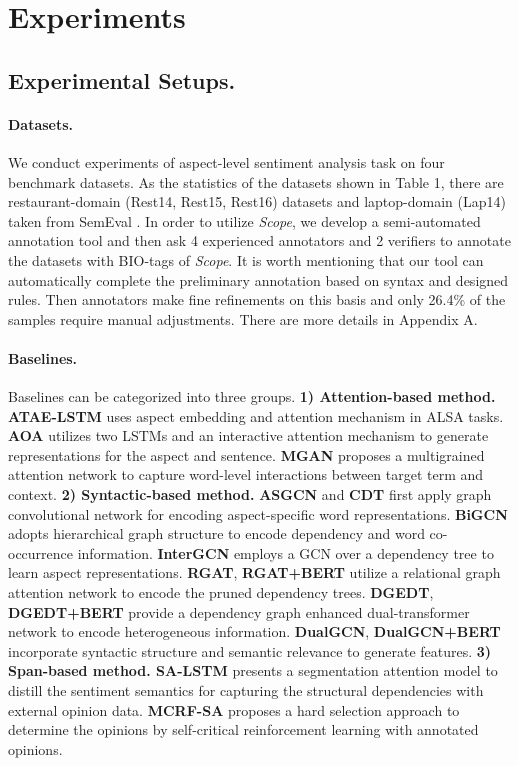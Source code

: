 \documentclass{article}
\begin{document}
\section{Experiments}
\subsection{Experimental Setups.}
\paragraph{Datasets.} We conduct experiments of aspect-level sentiment analysis task on four benchmark datasets. As the statistics of the datasets shown in Table 1, there are  restaurant-domain (Rest14, Rest15, Rest16) datasets and laptop-domain (Lap14) taken from SemEval \cite{maria2014semeval,pontiki2015semeval,pontiki2016semeval}. In order to utilize \emph{Scope}, we develop a semi-automated annotation tool and then ask 4 experienced annotators and 2 verifiers to annotate the datasets with BIO-tags of \emph{Scope}. It is worth mentioning that our tool can automatically complete the preliminary annotation based on syntax and designed rules. Then annotators make fine refinements on this basis and only 26.4\% of the samples require manual adjustments. There are more details in Appendix A.


\paragraph{Baselines.}
Baselines can be categorized into three groups.   \textbf{1) Attention-based method.} \textbf{ATAE-LSTM} \cite{wang2016attention} uses aspect embedding and attention mechanism in ALSA tasks. \textbf{AOA} \cite{huang2018aspect} utilizes two LSTMs and an interactive attention mechanism to generate representations for the aspect and sentence. \textbf{MGAN} \cite{fan2018multi} proposes a multigrained attention network to capture word-level interactions between target term and context.  \textbf{2) Syntactic-based method.} \textbf{ASGCN} \cite{zhang2019aspect} and \textbf{CDT} \cite{sun2019aspect} first apply graph convolutional network for encoding aspect-specific word representations. \textbf{BiGCN} \cite{zhang2020convolution} adopts hierarchical graph structure to encode dependency and word co-occurrence information. \textbf{InterGCN} \cite{liang2020jointly} employs a GCN over a dependency tree to learn aspect representations. \textbf{RGAT}, \textbf{RGAT+BERT} 
\cite{wang2020relational} utilize a relational graph attention network to encode the pruned dependency trees. \textbf{DGEDT}, \textbf{DGEDT+BERT} \cite{tang2020dependency} provide a dependency graph enhanced dual-transformer network to encode heterogeneous information. \textbf{DualGCN}, \textbf{DualGCN+BERT} \cite{rui2021dual} incorporate syntactic structure and semantic relevance to generate features.  \textbf{3) Span-based method. SA-LSTM}  \cite{wang2018learning} presents a segmentation attention model to distill the sentiment semantics for capturing the structural dependencies with external opinion data. \textbf{MCRF-SA} \cite{xu2020aspect} proposes a hard selection approach to determine the opinions by self-critical reinforcement learning with annotated opinions.
\end{document}
